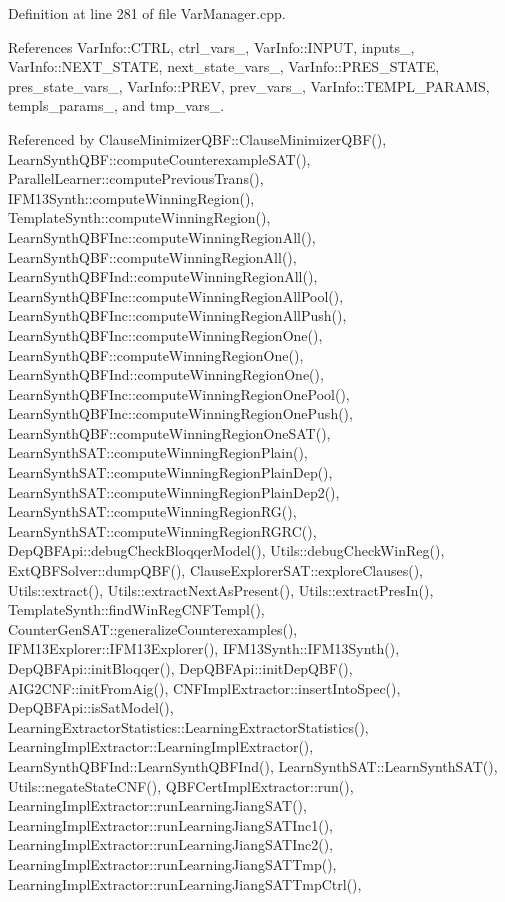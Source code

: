 Definition at line 281 of file Var\-Manager.\-cpp.



References Var\-Info\-::\-C\-T\-R\-L, ctrl\-\_\-vars\-\_\-, Var\-Info\-::\-I\-N\-P\-U\-T, inputs\-\_\-, Var\-Info\-::\-N\-E\-X\-T\-\_\-\-S\-T\-A\-T\-E, next\-\_\-state\-\_\-vars\-\_\-, Var\-Info\-::\-P\-R\-E\-S\-\_\-\-S\-T\-A\-T\-E, pres\-\_\-state\-\_\-vars\-\_\-, Var\-Info\-::\-P\-R\-E\-V, prev\-\_\-vars\-\_\-, Var\-Info\-::\-T\-E\-M\-P\-L\-\_\-\-P\-A\-R\-A\-M\-S, templs\-\_\-params\-\_\-, and tmp\-\_\-vars\-\_\-.



Referenced by Clause\-Minimizer\-Q\-B\-F\-::\-Clause\-Minimizer\-Q\-B\-F(), Learn\-Synth\-Q\-B\-F\-::compute\-Counterexample\-S\-A\-T(), Parallel\-Learner\-::compute\-Previous\-Trans(), I\-F\-M13\-Synth\-::compute\-Winning\-Region(), Template\-Synth\-::compute\-Winning\-Region(), Learn\-Synth\-Q\-B\-F\-Inc\-::compute\-Winning\-Region\-All(), Learn\-Synth\-Q\-B\-F\-::compute\-Winning\-Region\-All(), Learn\-Synth\-Q\-B\-F\-Ind\-::compute\-Winning\-Region\-All(), Learn\-Synth\-Q\-B\-F\-Inc\-::compute\-Winning\-Region\-All\-Pool(), Learn\-Synth\-Q\-B\-F\-Inc\-::compute\-Winning\-Region\-All\-Push(), Learn\-Synth\-Q\-B\-F\-Inc\-::compute\-Winning\-Region\-One(), Learn\-Synth\-Q\-B\-F\-::compute\-Winning\-Region\-One(), Learn\-Synth\-Q\-B\-F\-Ind\-::compute\-Winning\-Region\-One(), Learn\-Synth\-Q\-B\-F\-Inc\-::compute\-Winning\-Region\-One\-Pool(), Learn\-Synth\-Q\-B\-F\-Inc\-::compute\-Winning\-Region\-One\-Push(), Learn\-Synth\-Q\-B\-F\-::compute\-Winning\-Region\-One\-S\-A\-T(), Learn\-Synth\-S\-A\-T\-::compute\-Winning\-Region\-Plain(), Learn\-Synth\-S\-A\-T\-::compute\-Winning\-Region\-Plain\-Dep(), Learn\-Synth\-S\-A\-T\-::compute\-Winning\-Region\-Plain\-Dep2(), Learn\-Synth\-S\-A\-T\-::compute\-Winning\-Region\-R\-G(), Learn\-Synth\-S\-A\-T\-::compute\-Winning\-Region\-R\-G\-R\-C(), Dep\-Q\-B\-F\-Api\-::debug\-Check\-Bloqqer\-Model(), Utils\-::debug\-Check\-Win\-Reg(), Ext\-Q\-B\-F\-Solver\-::dump\-Q\-B\-F(), Clause\-Explorer\-S\-A\-T\-::explore\-Clauses(), Utils\-::extract(), Utils\-::extract\-Next\-As\-Present(), Utils\-::extract\-Pres\-In(), Template\-Synth\-::find\-Win\-Reg\-C\-N\-F\-Templ(), Counter\-Gen\-S\-A\-T\-::generalize\-Counterexamples(), I\-F\-M13\-Explorer\-::\-I\-F\-M13\-Explorer(), I\-F\-M13\-Synth\-::\-I\-F\-M13\-Synth(), Dep\-Q\-B\-F\-Api\-::init\-Bloqqer(), Dep\-Q\-B\-F\-Api\-::init\-Dep\-Q\-B\-F(), A\-I\-G2\-C\-N\-F\-::init\-From\-Aig(), C\-N\-F\-Impl\-Extractor\-::insert\-Into\-Spec(), Dep\-Q\-B\-F\-Api\-::is\-Sat\-Model(), Learning\-Extractor\-Statistics\-::\-Learning\-Extractor\-Statistics(), Learning\-Impl\-Extractor\-::\-Learning\-Impl\-Extractor(), Learn\-Synth\-Q\-B\-F\-Ind\-::\-Learn\-Synth\-Q\-B\-F\-Ind(), Learn\-Synth\-S\-A\-T\-::\-Learn\-Synth\-S\-A\-T(), Utils\-::negate\-State\-C\-N\-F(), Q\-B\-F\-Cert\-Impl\-Extractor\-::run(), Learning\-Impl\-Extractor\-::run\-Learning\-Jiang\-S\-A\-T(), Learning\-Impl\-Extractor\-::run\-Learning\-Jiang\-S\-A\-T\-Inc1(), Learning\-Impl\-Extractor\-::run\-Learning\-Jiang\-S\-A\-T\-Inc2(), Learning\-Impl\-Extractor\-::run\-Learning\-Jiang\-S\-A\-T\-Tmp(), Learning\-Impl\-Extractor\-::run\-Learning\-Jiang\-S\-A\-T\-Tmp\-Ctrl(), 